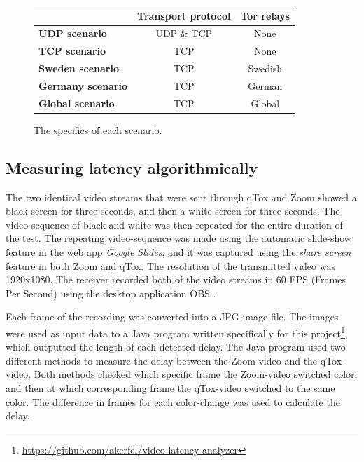 \documentclass{kththesis}
\begin{document}
\begin{figure}[!htb]
    \centering
    \begin{center}
    \begin{tabular}{ | l | c | c |}  
        \cline{2-3}
        \multicolumn{1}{l|}{} & Transport protocol & Tor relays \\ [0.5ex]
        \hline
        \textbf{UDP scenario}       & UDP \& TCP & None \\
        \hline
        \textbf{TCP scenario}       & TCP & None \\
        \hline
        \textbf{Sweden scenario}    & TCP & Swedish \\
        \hline
        \textbf{Germany scenario}   & TCP & German \\
        \hline
        \textbf{Global scenario}    & TCP & Global \\
        \hline
    \end{tabular}
    \caption{The specifics of each scenario.}
    \label{table:scenariosTable}
    \end{center}
\end{figure}

\subsection{Measuring latency algorithmically}
\label{section:measuringlatency}
The two identical video streams that were sent through qTox and Zoom showed a black screen for three seconds, and then a white screen for three seconds. The video-sequence of black and white was then repeated for the entire duration of the test. The repeating video-sequence was made using the automatic slide-show feature in the web app \emph{Google Slides}, and it was captured using the \emph{share screen} feature in both Zoom and qTox. The resolution of the transmitted video was 1920x1080. The receiver recorded both of the video streams in 60 FPS (Frames Per Second) using the desktop application OBS \parencite{OBS}.

Each frame of the recording was converted into a JPG image file. The images were used as input data to a Java program written specifically for this project\footnote{\url{https://github.com/akerfel/video-latency-analyzer}}, which outputted the length of each detected delay. The Java program used two different methods to measure the delay between the Zoom-video and the qTox-video. Both methods checked which specific frame the Zoom-video switched color, and then at which corresponding frame the qTox-video switched to the same color. The difference in frames for each color-change was used to calculate the delay.
\end{document}
